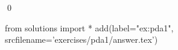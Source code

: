 
\begin{ex} 
  \label{ex:pda1}
  
  \qed
\end{ex} 
\begin{python0}
from solutions import *
add(label="ex:pda1",
    srcfilename='exercises/pda1/answer.tex') 
\end{python0}
